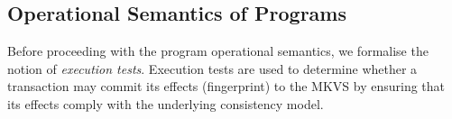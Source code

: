 \subsection{Operational Semantics of Programs}
\label{sec:prog-semantics}

Before proceeding with the program operational semantics, we formalise the notion of \emph{execution tests}.
Execution tests are used to determine whether a transaction may commit its effects (fingerprint) to the MKVS by ensuring that its  effects comply with the underlying consistency model.

